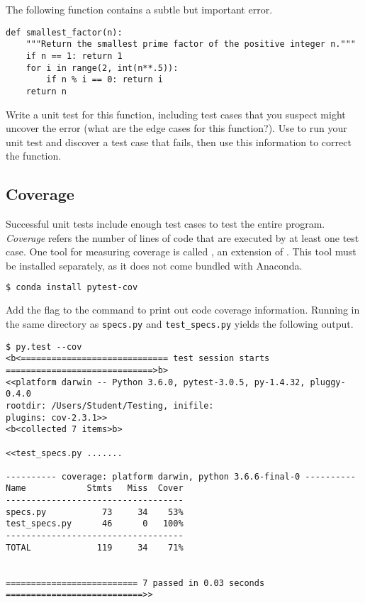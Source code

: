 \begin{problem} %
The following function contains a subtle but important error.
\begin{lstlisting}
def smallest_factor(n):
    """Return the smallest prime factor of the positive integer n."""
    if n == 1: return 1
    for i in range(2, int(n**.5)):
        if n % i == 0: return i
    return n
\end{lstlisting}
Write a unit test for this function, including test cases that you suspect might uncover the error (what are the edge cases for this function?).
Use  to run your unit test and discover a test case that fails, then use this information to correct the function.
\label{prob:unittest_intro}
\end{problem}

\subsection*{Coverage} %

Successful unit tests include enough test cases to test the entire program.
\emph{Coverage} refers the number of lines of code that are executed by at least one test case.
One tool for measuring coverage is called , an extension of .
This tool must be installed separately, as it does not come bundled with Anaconda.

\begin{lstlisting}[language=bash]
$ conda install pytest-cov
\end{lstlisting}

Add the flag  to the  command to print out code coverage information.
Running  in the same directory as \texttt{specs.py} and \texttt{test\_specs.py} yields the following output.

\begin{lstlisting}
$ py.test --cov
<b<============================= test session starts =============================>b>
<<platform darwin -- Python 3.6.0, pytest-3.0.5, py-1.4.32, pluggy-0.4.0
rootdir: /Users/Student/Testing, inifile:
plugins: cov-2.3.1>>
<b<collected 7 items>b>

<<test_specs.py .......

---------- coverage: platform darwin, python 3.6.6-final-0 ----------
Name            Stmts   Miss  Cover
-----------------------------------
specs.py           73     34    53%
test_specs.py      46      0   100%
-----------------------------------
TOTAL             119     34    71%


========================== 7 passed in 0.03 seconds ===========================>>\end{lstlisting}

